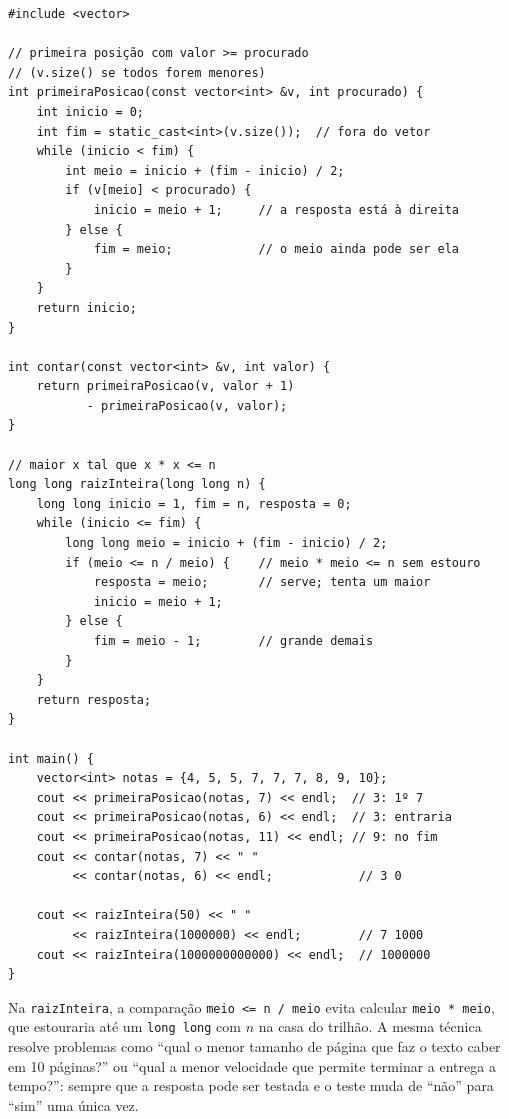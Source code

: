 \begin{codigo}
\begin{Verbatim}[breaklines=true, breaksymbolleft={}, fontsize=\footnotesize]
#include <vector>

// primeira posição com valor >= procurado
// (v.size() se todos forem menores)
int primeiraPosicao(const vector<int> &v, int procurado) {
    int inicio = 0;
    int fim = static_cast<int>(v.size());  // fora do vetor
    while (inicio < fim) {
        int meio = inicio + (fim - inicio) / 2;
        if (v[meio] < procurado) {
            inicio = meio + 1;     // a resposta está à direita
        } else {
            fim = meio;            // o meio ainda pode ser ela
        }
    }
    return inicio;
}

int contar(const vector<int> &v, int valor) {
    return primeiraPosicao(v, valor + 1)
           - primeiraPosicao(v, valor);
}

// maior x tal que x * x <= n
long long raizInteira(long long n) {
    long long inicio = 1, fim = n, resposta = 0;
    while (inicio <= fim) {
        long long meio = inicio + (fim - inicio) / 2;
        if (meio <= n / meio) {    // meio * meio <= n sem estouro
            resposta = meio;       // serve; tenta um maior
            inicio = meio + 1;
        } else {
            fim = meio - 1;        // grande demais
        }
    }
    return resposta;
}

int main() {
    vector<int> notas = {4, 5, 5, 7, 7, 7, 8, 9, 10};
    cout << primeiraPosicao(notas, 7) << endl;  // 3: 1º 7
    cout << primeiraPosicao(notas, 6) << endl;  // 3: entraria
    cout << primeiraPosicao(notas, 11) << endl; // 9: no fim
    cout << contar(notas, 7) << " "
         << contar(notas, 6) << endl;            // 3 0

    cout << raizInteira(50) << " "
         << raizInteira(1000000) << endl;        // 7 1000
    cout << raizInteira(1000000000000) << endl;  // 1000000
}
\end{Verbatim}
\end{codigo}

Na \texttt{raizInteira}, a comparação \texttt{meio <= n / meio} evita calcular \texttt{meio * meio}, que estouraria até um \texttt{long long} com $n$ na casa do trilhão. A mesma técnica resolve problemas como ``qual o menor tamanho de página que faz o texto caber em 10 páginas?'' ou ``qual a menor velocidade que permite terminar a entrega a tempo?'': sempre que a resposta pode ser testada e o teste muda de ``não'' para ``sim'' uma única vez.

